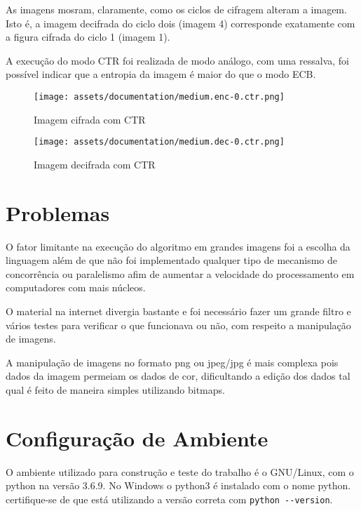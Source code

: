 \documentclass[11pt]{article}
\begin{document}
As imagens mosram, claramente, como os ciclos de cifragem alteram a imagem. Isto
é, a imagem decifrada do ciclo dois (imagem 4) corresponde exatamente com a
figura cifrada do ciclo 1 (imagem 1).

A execução do modo CTR foi realizada de modo análogo, com uma ressalva, foi
possível indicar que a entropia da imagem é maior do que o modo ECB.

\begin{figure}[ht]
  \center
  \label{ fig7}
  \begin{minipage}[b]{0.4\linewidth}
    \centering
    \texttt{[image: assets/documentation/medium.enc-0.ctr.png]}
    \caption{Imagem cifrada com CTR}
    \vspace{4ex}
  \end{minipage}%
  \begin{minipage}[b]{0.4\linewidth}
    \centering
    \texttt{[image: assets/documentation/medium.dec-0.ctr.png]}
    \caption{Imagem decifrada com CTR}
    \vspace{4ex}
  \end{minipage}
\end{figure}

\section{Problemas}
\label{sec:orgdd05abc}

O fator limitante na execução do algoritmo em grandes imagens foi a escolha da
linguagem além de que não foi implementado qualquer tipo de mecanismo de
concorrência ou paralelismo afim de aumentar a velocidade do processamento em
computadores com mais núcleos.

O material na internet divergia bastante e foi necessário fazer um grande filtro
e vários testes para verificar o que funcionava ou não, com respeito a
manipulação de imagens.

A manipulação de imagens no formato png ou jpeg/jpg é mais complexa pois dados
da imagem permeiam os dados de cor, dificultando a edição dos dados tal qual é
feito de maneira simples utilizando bitmaps.

\section{Configuração de Ambiente}
\label{sec:orgfad789a}

O ambiente utilizado para construção e teste do trabalho é o GNU/Linux, com o
python na versão 3.6.9. No Windows o python3 é instalado com o nome python.
certifique-se de que está utilizando a versão correta com \texttt{python -{}-version}.
\end{document}
